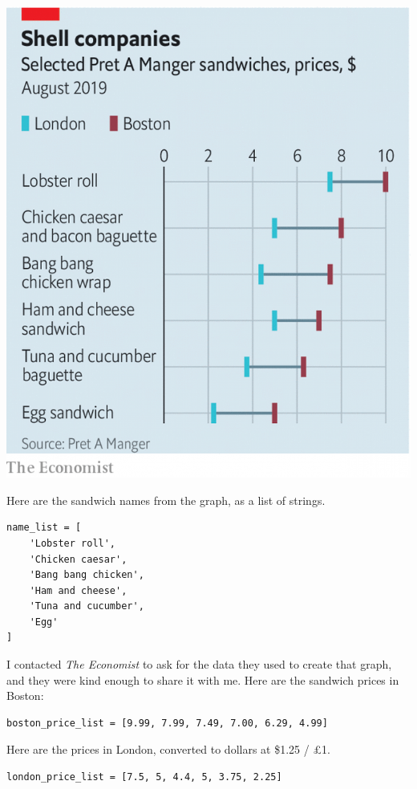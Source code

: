 \includegraphics{chapters/figs/20190907_FNC941.png}

Here are the sandwich names from the graph, as a list of strings.

\begin{lstlisting}[]
name_list = [
    'Lobster roll',
    'Chicken caesar',
    'Bang bang chicken',
    'Ham and cheese',
    'Tuna and cucumber',
    'Egg'
]
\end{lstlisting}

I contacted \emph{The Economist} to ask for the data they used to create
that graph, and they were kind enough to share it with me. Here are the
sandwich prices in Boston:

\begin{lstlisting}[]
boston_price_list = [9.99, 7.99, 7.49, 7.00, 6.29, 4.99]
\end{lstlisting}

Here are the prices in London, converted to dollars at \$1.25 / £1.

\begin{lstlisting}[]
london_price_list = [7.5, 5, 4.4, 5, 3.75, 2.25]
\end{lstlisting}

